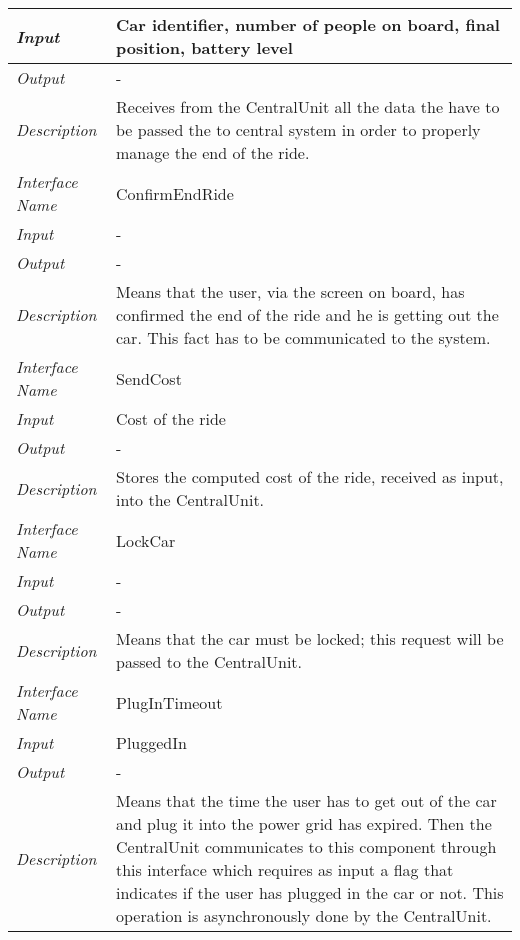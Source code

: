 \documentclass[11pt,a4paper]{report}
\begin{document}
\begin{tabularx}{\textwidth}{|>{\em}l|X|}
	\hline
	Input & Car identifier, number of people on board, final position, battery level\\
	\hline
	Output & -\\
	\hline
	Description &Receives from the CentralUnit all the data the have to be passed the to central system in order to properly manage the end of the ride.\\
	\hline
	\hline
	Interface Name& ConfirmEndRide\\
	\hline
	Input & -\\
	\hline
	Output & -\\
	\hline
	Description &Means that the user, via the screen on board, has confirmed the end of the ride and he is getting out the car. This fact has to be communicated to the system.\\
	\hline
	\hline
	Interface Name& SendCost\\
	\hline
	Input & Cost of the ride\\
	\hline
	Output & -\\
	\hline
	Description &Stores the computed cost of the ride, received as input, into the CentralUnit.\\
	\hline
	\hline
	Interface Name& LockCar\\
	\hline
	Input &-\\
	\hline
	Output & -\\
	\hline
	Description &Means that the car must be locked; this request will be passed to the CentralUnit.\\
	\hline
	\hline
	Interface Name& PlugInTimeout\\
	\hline
	Input & PluggedIn\\
	\hline
	Output & -\\
	\hline
	Description &Means that the time the user has to get out of the car and plug it into the power grid has expired. Then the CentralUnit communicates to this component through this interface which requires as input a flag that indicates if the user has plugged in the car or not. This operation is asynchronously done by the CentralUnit.\\
	\hline
	\end{tabularx}
\end{document}
